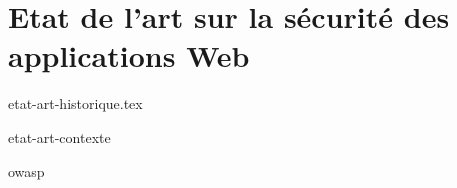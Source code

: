 \part{Etat de l'art sur la sécurité des applications Web}
\parttoc %

%

%
{etat-art-historique.tex}

% 
{etat-art-contexte}

% 
{owasp}